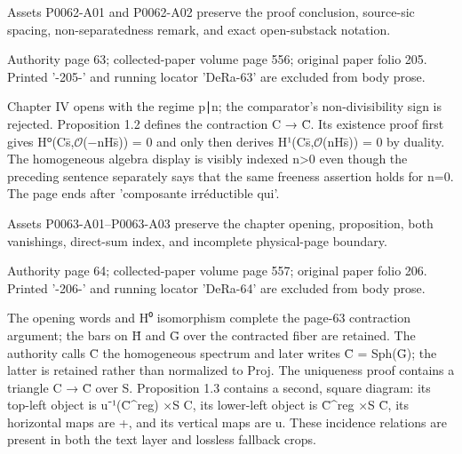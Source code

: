 \documentclass[11pt,a4paper]{article}
\begin{document}
Assets P0062-A01 and P0062-A02 preserve the proof conclusion, source-sic spacing, non-separatedness remark, and exact open-substack notation.


\par\medskip
\hypertarget{D018-P0063}{}
\par\smallskip
Authority page 63; collected-paper volume page 556; original paper folio 205. Printed '-205-' and running locator 'DeRa-63' are excluded from body prose.

Chapter IV opens with the regime p∣n; the comparator's non-divisibility sign is rejected. Proposition 1.2 defines the contraction C → C̄. Its existence proof first gives H⁰(C\textunderscore{}s̄,\ensuremath{\mathcal{O}}(−nH\textunderscore{}s̄)) = 0 and only then derives H¹(C\textunderscore{}s̄,\ensuremath{\mathcal{O}}(nH\textunderscore{}s̄)) = 0 by duality. The homogeneous algebra display is visibly indexed n>0 even though the preceding sentence separately says that the same freeness assertion holds for n=0. The page ends after 'composante irréductible qui'.

Assets P0063-A01--P0063-A03 preserve the chapter opening, proposition, both vanishings, direct-sum index, and incomplete physical-page boundary.


\par\medskip
\hypertarget{D018-P0064}{}
\par\smallskip
Authority page 64; collected-paper volume page 557; original paper folio 206. Printed '-206-' and running locator 'DeRa-64' are excluded from body prose.

The opening words and H⁰ isomorphism complete the page-63 contraction argument; the bars on H̄ and Ḡ over the contracted fiber are retained. The authority calls C̄ the homogeneous spectrum and later writes C̄ = Sph(Ḡ); the latter is retained rather than normalized to Proj. The uniqueness proof contains a triangle C → C̄ over S. Proposition 1.3 contains a second, square diagram: its top-left object is u⁻¹(C̄\textasciicircum{}reg) ×\textunderscore{}S C, its lower-left object is C̄\textasciicircum{}reg ×\textunderscore{}S C̄, its horizontal maps are +, and its vertical maps are u. These incidence relations are present in both the text layer and lossless fallback crops.
\end{document}

